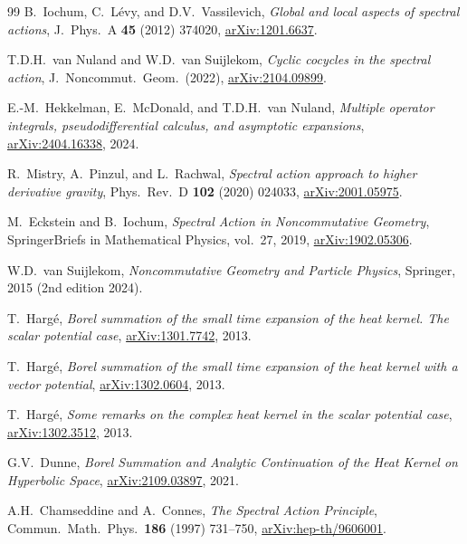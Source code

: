 \documentclass[11pt,a4paper]{article}
\begin{document}
\begin{thebibliography}{99}
B.~Iochum, C.~L\'{e}vy, and D.V.~Vassilevich,
\textit{Global and local aspects of spectral actions},
J.\ Phys.\ A \textbf{45} (2012) 374020,
\href{https://arxiv.org/abs/1201.6637}{arXiv:1201.6637}.

T.D.H.~van Nuland and W.D.~van Suijlekom,
\textit{Cyclic cocycles in the spectral action},
J.\ Noncommut.\ Geom.\ (2022),
\href{https://arxiv.org/abs/2104.09899}{arXiv:2104.09899}.

E.-M.~Hekkelman, E.~McDonald, and T.D.H.~van Nuland,
\textit{Multiple operator integrals, pseudodifferential calculus,
and asymptotic expansions},
\href{https://arxiv.org/abs/2404.16338}{arXiv:2404.16338}, 2024.

R.~Mistry, A.~Pinzul, and L.~Rachwal,
\textit{Spectral action approach to higher derivative gravity},
Phys.\ Rev.\ D \textbf{102} (2020) 024033,
\href{https://arxiv.org/abs/2001.05975}{arXiv:2001.05975}.

M.~Eckstein and B.~Iochum,
\textit{Spectral Action in Noncommutative Geometry},
SpringerBriefs in Mathematical Physics, vol.~27, 2019,
\href{https://arxiv.org/abs/1902.05306}{arXiv:1902.05306}.

W.D.~van Suijlekom,
\textit{Noncommutative Geometry and Particle Physics},
Springer, 2015 (2nd edition 2024).

T.~Harg\'{e},
\textit{Borel summation of the small time expansion of the heat kernel.
The scalar potential case},
\href{https://arxiv.org/abs/1301.7742}{arXiv:1301.7742}, 2013.

T.~Harg\'{e},
\textit{Borel summation of the small time expansion of the heat kernel
with a vector potential},
\href{https://arxiv.org/abs/1302.0604}{arXiv:1302.0604}, 2013.

T.~Harg\'{e},
\textit{Some remarks on the complex heat kernel in the scalar
potential case},
\href{https://arxiv.org/abs/1302.3512}{arXiv:1302.3512}, 2013.

G.V.~Dunne,
\textit{Borel Summation and Analytic Continuation of the Heat Kernel
on Hyperbolic Space},
\href{https://arxiv.org/abs/2109.03897}{arXiv:2109.03897}, 2021.

A.H.~Chamseddine and A.~Connes,
\textit{The Spectral Action Principle},
Commun.\ Math.\ Phys.\ \textbf{186} (1997) 731--750,
\href{https://arxiv.org/abs/hep-th/9606001}{arXiv:hep-th/9606001}.


\end{thebibliography}
\end{document}
